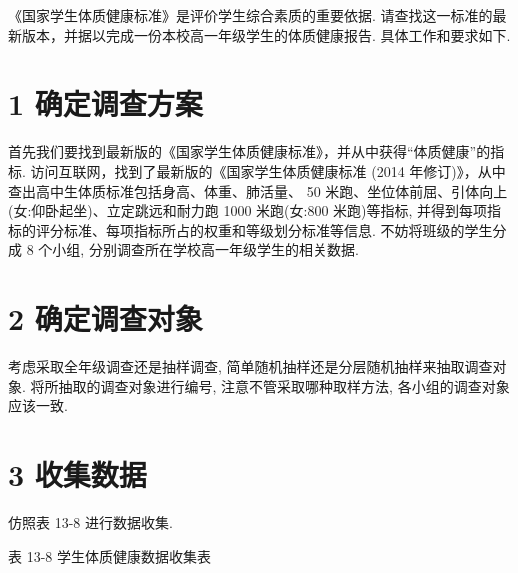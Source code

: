 \documentclass[10pt]{article}
\begin{document}
《国家学生体质健康标准》是评价学生综合素质的重要依据. 请查找这一标准的最新版本，并据以完成一份本校高一年级学生的体质健康报告. 具体工作和要求如下.

\section*{1 确定调查方案}

首先我们要找到最新版的《国家学生体质健康标准》，并从中获得“体质健康”的指标. 访问互联网，找到了最新版的《国家学生体质健康标准 (2014 年修订)》，从中查出高中生体质标准包括身高、体重、肺活量、 50 米跑、坐位体前屈、引体向上 (女:仰卧起坐)、立定跳远和耐力跑 1000 米跑(女:800 米跑)等指标, 并得到每项指标的评分标准、每项指标所占的权重和等级划分标准等信息. 不妨将班级的学生分成 8 个小组, 分别调查所在学校高一年级学生的相关数据.

\section*{2 确定调查对象}

考虑采取全年级调查还是抽样调查, 简单随机抽样还是分层随机抽样来抽取调查对象. 将所抽取的调查对象进行编号, 注意不管采取哪种取样方法, 各小组的调查对象应该一致.

\section*{3 收集数据}

仿照表 13-8 进行数据收集.



表 13-8 学生体质健康数据收集表

\begin{center}
\end{center}
\end{document}
